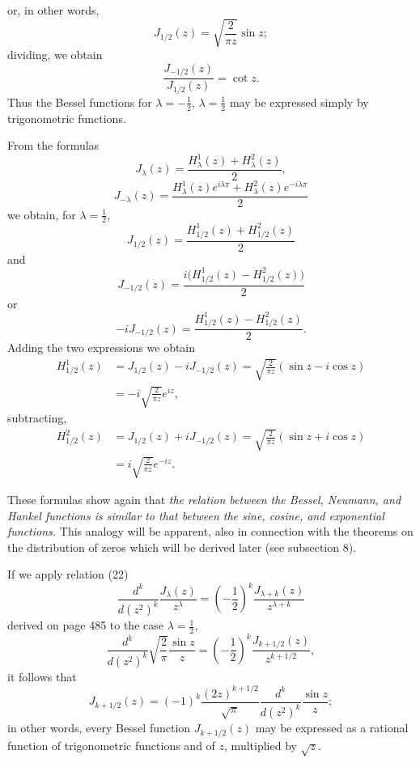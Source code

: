 or, in other words,
\begin{equation}\tag{25}
J_{1/2}(z)=\sqrt{\frac2{\pi z}}\sin z;
\end{equation}
dividing, we obtain
\[
\frac{J_{-1/2}(z)}{J_{1/2}(z)}=\cot z.
\]
Thus the Bessel functions for $\lambda=-\tfrac12$, $\lambda=\tfrac12$ may be expressed simply by trigonometric functions.

From the formulas
\[
J_\lambda(z)=\frac{H_\lambda^1(z)+H_\lambda^2(z)}2,
\]
\[
J_{-\lambda}(z)=\frac{H_\lambda^1(z)e^{i\lambda\pi}+H_\lambda^2(z)e^{-i\lambda\pi}}2
\]
we obtain, for $\lambda=\tfrac12$,
\[
J_{1/2}(z)=\frac{H_{1/2}^1(z)+H_{1/2}^2(z)}2
\]
and
\[
J_{-1/2}(z)=\frac{i\bigl(H_{1/2}^1(z)-H_{1/2}^2(z)\bigr)}2
\]
or
\[
-iJ_{-1/2}(z)=\frac{H_{1/2}^1(z)-H_{1/2}^2(z)}2.
\]
Adding the two expressions we obtain
\begin{equation}\tag{26}
\begin{aligned}
H_{1/2}^1(z)&=J_{1/2}(z)-iJ_{-1/2}(z)
=\sqrt{\frac2{\pi z}}(\sin z-i\cos z)\\
&=-i\sqrt{\frac2{\pi z}}e^{iz},
\end{aligned}
\end{equation}
subtracting,
\begin{equation}\tag{26'}
\begin{aligned}
H_{1/2}^2(z)&=J_{1/2}(z)+iJ_{-1/2}(z)
=\sqrt{\frac2{\pi z}}(\sin z+i\cos z)\\
&=i\sqrt{\frac2{\pi z}}e^{-iz}.
\end{aligned}
\end{equation}

These formulas show again that \emph{the relation between the Bessel, Neumann, and Hankel functions is similar to that between the sine, cosine, and exponential functions.} This analogy will be apparent, also in connection with the theorems on the distribution of zeros which will be derived later (see subsection 8).

If we apply relation (22)
\[
\frac{d^k}{d(z^2)^k}\frac{J_\lambda(z)}{z^\lambda}
=\left(-\frac12\right)^k\frac{J_{\lambda+k}(z)}{z^{\lambda+k}}
\]
derived on page 485 to the case $\lambda=\tfrac12$,
\[
\frac{d^k}{d(z^2)^k}\sqrt{\frac2\pi}\frac{\sin z}{z}
=\left(-\frac12\right)^k\frac{J_{k+1/2}(z)}{z^{k+1/2}},
\]
it follows that
\[
J_{k+1/2}(z)=(-1)^k\frac{(2z)^{k+1/2}}{\sqrt\pi}
\frac{d^k}{d(z^2)^k}\frac{\sin z}{z};
\]
in other words, every Bessel function $J_{k+1/2}(z)$ may be expressed as a rational function of trigonometric functions and of $z$, multiplied by $\sqrt z$.

